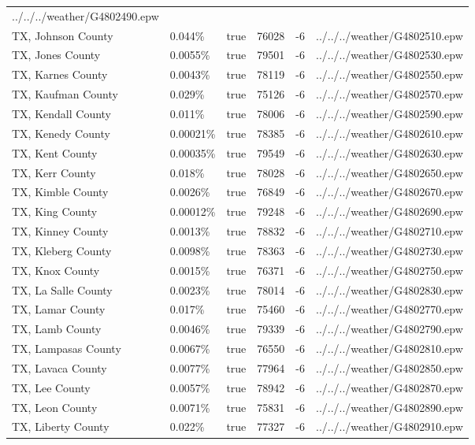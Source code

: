 \begin{longtable}[]{@{}llllll@{}}
../../../weather/G4802490.epw \\
TX, Johnson County & 0.044\% & true & 76028 & -6 &
../../../weather/G4802510.epw \\
TX, Jones County & 0.0055\% & true & 79501 & -6 &
../../../weather/G4802530.epw \\
TX, Karnes County & 0.0043\% & true & 78119 & -6 &
../../../weather/G4802550.epw \\
TX, Kaufman County & 0.029\% & true & 75126 & -6 &
../../../weather/G4802570.epw \\
TX, Kendall County & 0.011\% & true & 78006 & -6 &
../../../weather/G4802590.epw \\
TX, Kenedy County & 0.00021\% & true & 78385 & -6 &
../../../weather/G4802610.epw \\
TX, Kent County & 0.00035\% & true & 79549 & -6 &
../../../weather/G4802630.epw \\
TX, Kerr County & 0.018\% & true & 78028 & -6 &
../../../weather/G4802650.epw \\
TX, Kimble County & 0.0026\% & true & 76849 & -6 &
../../../weather/G4802670.epw \\
TX, King County & 0.00012\% & true & 79248 & -6 &
../../../weather/G4802690.epw \\
TX, Kinney County & 0.0013\% & true & 78832 & -6 &
../../../weather/G4802710.epw \\
TX, Kleberg County & 0.0098\% & true & 78363 & -6 &
../../../weather/G4802730.epw \\
TX, Knox County & 0.0015\% & true & 76371 & -6 &
../../../weather/G4802750.epw \\
TX, La Salle County & 0.0023\% & true & 78014 & -6 &
../../../weather/G4802830.epw \\
TX, Lamar County & 0.017\% & true & 75460 & -6 &
../../../weather/G4802770.epw \\
TX, Lamb County & 0.0046\% & true & 79339 & -6 &
../../../weather/G4802790.epw \\
TX, Lampasas County & 0.0067\% & true & 76550 & -6 &
../../../weather/G4802810.epw \\
TX, Lavaca County & 0.0077\% & true & 77964 & -6 &
../../../weather/G4802850.epw \\
TX, Lee County & 0.0057\% & true & 78942 & -6 &
../../../weather/G4802870.epw \\
TX, Leon County & 0.0071\% & true & 75831 & -6 &
../../../weather/G4802890.epw \\
TX, Liberty County & 0.022\% & true & 77327 & -6 &
../../../weather/G4802910.epw \\

\end{longtable}
